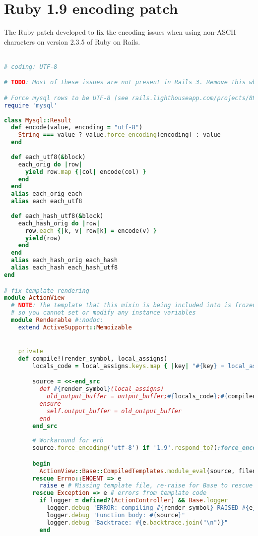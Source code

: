 \chapter{Ruby 1.9 encoding patch} %
\label{ap:ruby19_encoding_patch}

The Ruby patch developed to fix the encoding issues when using non-ASCII characters on version 2.3.5 of Ruby on Rails.\\\\

\begin{lstlisting}[language=ruby]
# coding: UTF-8

# TODO: Most of these issues are not present in Rails 3. Remove this when updating.

# Force mysql rows to be UTF-8 (see rails.lighthouseapp.com/projects/8994/tickets/2476)
require 'mysql'
 
class Mysql::Result
  def encode(value, encoding = "utf-8")
    String === value ? value.force_encoding(encoding) : value
  end
  
  def each_utf8(&block)
    each_orig do |row|
      yield row.map {|col| encode(col) }
    end
  end
  alias each_orig each
  alias each each_utf8
 
  def each_hash_utf8(&block)
    each_hash_orig do |row|
      row.each {|k, v| row[k] = encode(v) }
      yield(row)
    end
  end
  alias each_hash_orig each_hash
  alias each_hash each_hash_utf8
end

# fix template rendering
module ActionView
  # NOTE: The template that this mixin is being included into is frozen
  # so you cannot set or modify any instance variables
  module Renderable #:nodoc:
    extend ActiveSupport::Memoizable


    private    
    def compile!(render_symbol, local_assigns)
        locals_code = local_assigns.keys.map { |key| "#{key} = local_assigns[:#{key}];" }.join

        source = <<-end_src
          def #{render_symbol}(local_assigns)
            old_output_buffer = output_buffer;#{locals_code};#{compiled_source}
          ensure
            self.output_buffer = old_output_buffer
          end
        end_src
        
        # Workaround for erb
        source.force_encoding('utf-8') if '1.9'.respond_to?(:force_encoding)

        begin
          ActionView::Base::CompiledTemplates.module_eval(source, filename, 0)
        rescue Errno::ENOENT => e
          raise e # Missing template file, re-raise for Base to rescue
        rescue Exception => e # errors from template code
          if logger = defined?(ActionController) && Base.logger
            logger.debug "ERROR: compiling #{render_symbol} RAISED #{e}"
            logger.debug "Function body: #{source}"
            logger.debug "Backtrace: #{e.backtrace.join("\n")}"
          end


\end{lstlisting}
